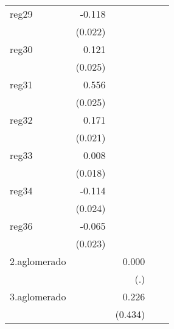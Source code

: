 {\begin{longtable}{l*{4}{D{.}{.}{-1}}}
\addlinespace
reg29       &      -0.118\sym{***}&                     &                     &                     \\
            &     (0.022)         &                     &                     &                     \\
\addlinespace
reg30       &       0.121\sym{***}&                     &                     &                     \\
            &     (0.025)         &                     &                     &                     \\
\addlinespace
reg31       &       0.556\sym{***}&                     &                     &                     \\
            &     (0.025)         &                     &                     &                     \\
\addlinespace
reg32       &       0.171\sym{***}&                     &                     &                     \\
            &     (0.021)         &                     &                     &                     \\
\addlinespace
reg33       &       0.008         &                     &                     &                     \\
            &     (0.018)         &                     &                     &                     \\
\addlinespace
reg34       &      -0.114\sym{***}&                     &                     &                     \\
            &     (0.024)         &                     &                     &                     \\
\addlinespace
reg36       &      -0.065\sym{**} &                     &                     &                     \\
            &     (0.023)         &                     &                     &                     \\
\addlinespace
2.aglomerado&                     &       0.000         &                     &                     \\
            &                     &         (.)         &                     &                     \\
\addlinespace
3.aglomerado&                     &       0.226         &                     &                     \\
            &                     &     (0.434)         &                     &                     \\

\end{longtable}}
